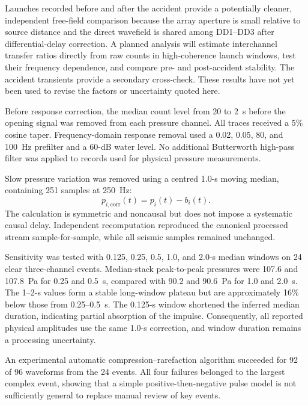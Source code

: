 \documentclass[]{seismica}
\begin{document}
Launches recorded before and after the accident provide a potentially cleaner,
independent free-field comparison because the array aperture is small relative
to source distance and the direct wavefield is shared among DD1--DD3 after
differential-delay correction. A planned analysis will estimate interchannel
transfer ratios directly from raw counts in high-coherence launch windows,
test their frequency dependence, and compare pre- and post-accident stability.
The accident transients provide a secondary cross-check. These results have
not yet been used to revise the factors or uncertainty quoted here.

Before response correction, the median count level from 20 to 2~s before the
opening signal was removed from each pressure channel. All traces received a
5\% cosine taper. Frequency-domain response removal used a 0.02, 0.05, 80, and
100~Hz prefilter and a 60-dB water level. No additional Butterworth high-pass
filter was applied to records used for physical pressure measurements.

Slow pressure variation was removed using a centred 1.0-s moving median,
containing 251 samples at 250~Hz:
\begin{equation}
 p_{i,\mathrm{corr}}(t)=p_i(t)-b_i(t).
\end{equation}
The calculation is symmetric and noncausal but does not impose a systematic
causal delay. Independent recomputation reproduced the canonical processed
stream sample-for-sample, while all seismic samples remained unchanged.

Sensitivity was tested with 0.125, 0.25, 0.5, 1.0, and 2.0-s median windows on
24 clear three-channel events. Median-stack peak-to-peak pressures were 107.6
and 107.8~Pa for 0.25 and 0.5~s, compared with 90.2 and 90.6~Pa for 1.0 and
2.0~s. The 1--2-s values form a stable long-window plateau but are
approximately 16\% below those from 0.25--0.5~s. The 0.125-s window shortened
the inferred median duration, indicating partial absorption of the impulse.
Consequently, all reported physical amplitudes use the same 1.0-s correction,
and window duration remains a processing uncertainty.

An experimental automatic compression--rarefaction algorithm succeeded for
92 of 96 waveforms from the 24 events. All four failures belonged to the
largest complex event, showing that a simple positive-then-negative pulse model
is not sufficiently general to replace manual review of key events.
\end{document}
